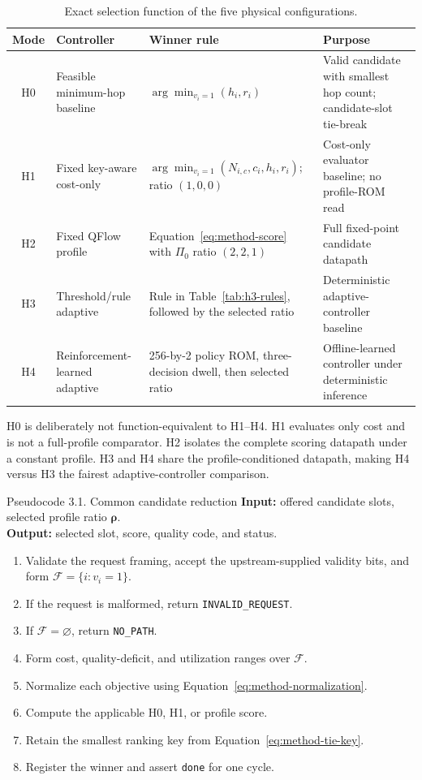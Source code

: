 \begin{table}[H]
\centering
\small
\caption{Exact selection function of the five physical configurations.}
\label{tab:h0-h4-definitions}
\begin{tabularx}{\textwidth}{@{}c p{} X p{}@{}}
\toprule
\textbf{Mode} & \textbf{Controller} & \textbf{Winner rule} & \textbf{Purpose}\\
\midrule
H0 & Feasible minimum-hop baseline & $\arg\min_{v_i=1}(h_i,r_i)$ & Valid candidate
with smallest hop count; candidate-slot tie-break\\
H1 & Fixed key-aware cost-only & $\arg\min_{v_i=1}(N_{i,c},c_i,h_i,r_i)$; ratio
$(1,0,0)$ & Cost-only evaluator baseline; no profile-ROM read\\
H2 & Fixed QFlow profile & Equation~\eqref{eq:method-score} with $\Pi_0$ ratio
$(2,2,1)$ & Full fixed-point candidate datapath\\
H3 & Threshold/rule adaptive & Rule in Table~\ref{tab:h3-rules}, followed by the
selected ratio & Deterministic adaptive-controller baseline\\
H4 & Reinforcement-learned adaptive & 256-by-2 policy ROM, three-decision dwell,
then selected ratio & Offline-learned controller under deterministic inference\\
\bottomrule
\end{tabularx}
\end{table}

H0 is deliberately not function-equivalent to H1--H4. H1 evaluates only cost and
is not a full-profile comparator. H2 isolates the complete scoring datapath under a
constant profile. H3 and H4 share the profile-conditioned datapath, making H4 versus
H3 the fairest adaptive-controller comparison.

\begin{pseudocode}{Pseudocode 3.1. Common candidate reduction}
\textbf{Input:} offered candidate slots, selected profile ratio $\boldsymbol\rho$.\\
\textbf{Output:} selected slot, score, quality code, and status.
\begin{enumerate}
  \item Validate the request framing, accept the upstream-supplied validity bits,
  and form $\mathcal F=\{i:v_i=1\}$.
  \item If the request is malformed, return \texttt{INVALID\_REQUEST}.
  \item If $\mathcal F=\varnothing$, return \texttt{NO\_PATH}.
  \item Form cost, quality-deficit, and utilization ranges over $\mathcal F$.
  \item Normalize each objective using Equation~\eqref{eq:method-normalization}.
  \item Compute the applicable H0, H1, or profile score.
  \item Retain the smallest ranking key from Equation~\eqref{eq:method-tie-key}.
  \item Register the winner and assert \texttt{done} for one cycle.
\end{enumerate}
\end{pseudocode}

